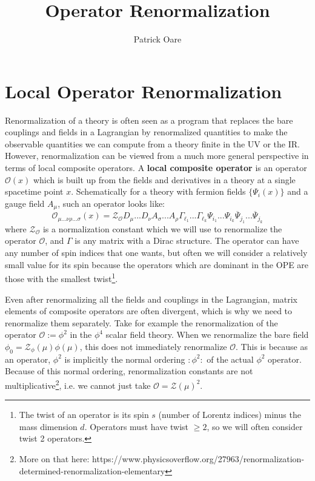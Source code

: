 \documentclass[11pt, oneside]{article}   	%
\title{Operator Renormalization}
\author{Patrick Oare}
\date{}							%
\theoremstyle{definition}
\begin{document}
\maketitle

\section{Local Operator Renormalization}

Renormalization of a theory is often seen as a program that replaces the bare couplings and fields in a Lagrangian by 
renormalized quantities to make the observable quantities we can compute from a theory finite in the UV or the IR. 
However, renormalization can be viewed from a much more general perspective in terms of local composite operators. 
A \textbf{local composite operator} is an operator $\mathcal O(x)$ which is built up from the fields and derivatives in a theory 
at a single spacetime point $x$. Schematically for a theory with fermion fields $\{\Psi_i(x)\}$ and a gauge field $A_\mu$, 
such an operator looks like:
\begin{equation}
	\mathcal O_{\mu ...\nu \rho ... \sigma}(x) = \mathcal Z_{\mathcal O} D_{\mu}...D_{\nu} A_{\sigma} ... A_{\rho} 
	\Gamma_{\ell_1} ... \Gamma_{\ell_k} \Psi_{i_1} ... \Psi_{i_k} \overline \Psi_{j_1} ... \overline\Psi_{j_k}
\end{equation}
where $\mathcal Z_{\mathcal O}$ is a normalization constant which we will use to renormalize the operator $\mathcal O$, 
and $\Gamma$ is any matrix with a Dirac structure. The operator can have any number of spin indices that one wants, but 
often we will consider a relatively small value for its spin because the operators which are dominant in the OPE 
are those with the smallest twist\footnote{The twist of an operator is its spin $s$ (number of Lorentz indices) minus the mass 
dimension $d$. Operators must have twist $\geq 2$, so we will often consider twist 2 operators.}. 

Even after renormalizing all the fields and couplings in the Lagrangian, matrix elements of composite operators are often 
divergent, which is why we need to renormalize them separately. Take for example the renormalization of the operator 
$\mathcal O := \phi^2$ in the $\phi^4$ scalar field theory. When we renormalize the bare field $\phi_0 = \mathcal Z_\phi(\mu)
\phi(\mu)$, this does not immediately renormalize $\mathcal O$. This is because as an operator, $\phi^2$ is implicitly the 
normal ordering $:\phi^2:$ of the actual $\phi^2$ operator. Because of this normal ordering, renormalization constants 
are not multiplicative\footnote{More on that here: https://www.physicsoverflow.org/27963/renormalization-determined-renormalization-elementary}, i.e. we cannot just take $\mathcal O = \mathcal Z(\mu)^2$. 
\end{document}
